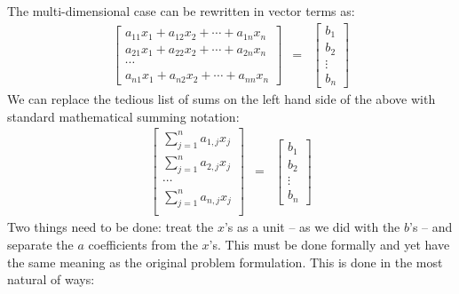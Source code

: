 \documentclass{article}
\begin{document}
The multi-dimensional case can be rewritten in vector terms as:
\begin{eqnarray}
  \left[
  \begin{array}{c}
  a_{11} x_1 + a_{12} x_2 + \cdots + a_{1n} x_n \\
  a_{21} x_1 + a_{22} x_2 + \cdots + a_{2n} x_n \\
  \cdots  \\
    a_{n1} x_1 + a_{n2} x_2 + \cdots + a_{nn} x_n
  \end{array}
  \right] & = & \left[
                 \begin{array}{c}
                   b_1 \\
                   b_2 \\
                   \vdots \\
                   b_n
                 \end{array}
   \right] \label{vector-form}
\end{eqnarray}
We can replace the tedious list of sums on the left hand side of the above
with standard mathematical summing notation:
\begin{eqnarray}
  \left[
  \begin{array}{c}
	\sum_{j=1}^n a_{1, j} x_j \\ 
	\sum_{j=1}^n a_{2, j} x_j \\ 
	\cdots \\
	\sum_{j=1}^n a_{n, j} x_j \\ 
  \end{array}
  \right] & = & \left[
                 \begin{array}{c}
                   b_1 \\
                   b_2 \\
                   \vdots \\
                   b_n
                 \end{array}
   \right] \label{vector-form1}
\end{eqnarray}
Two things need to be done: treat the $x$'s as a unit -- as we did with the
$b$'s -- and separate the $a$ coefficients from the $x$'s. This must be done formally
and yet have the same meaning as the original problem formulation.
This is done in the most natural of ways:
\end{document}
